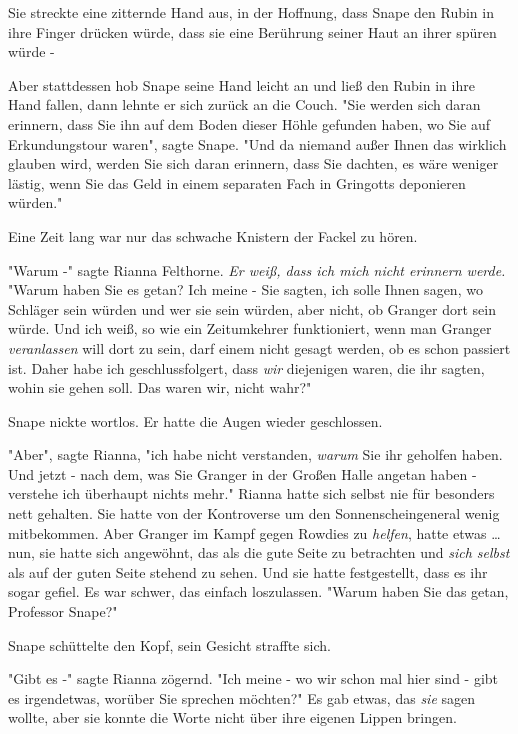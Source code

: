 {Sie streckte eine zitternde Hand aus, in der Hoffnung, dass Snape den Rubin in ihre Finger drücken würde, dass sie eine Berührung seiner Haut an ihrer spüren würde -

Aber stattdessen hob Snape seine Hand leicht an und ließ den Rubin in ihre Hand fallen, dann lehnte er sich zurück an die Couch. "Sie werden sich daran erinnern, dass Sie ihn auf dem Boden dieser Höhle gefunden haben, wo Sie auf Erkundungstour waren", sagte Snape. "Und da niemand außer Ihnen das wirklich glauben wird, werden Sie sich daran erinnern, dass Sie dachten, es wäre weniger lästig, wenn Sie das Geld in einem separaten Fach in Gringotts deponieren würden."

Eine Zeit lang war nur das schwache Knistern der Fackel zu hören.

"Warum -" sagte Rianna Felthorne. \emph{Er weiß, dass ich mich nicht erinnern werde.} "Warum haben Sie es getan? Ich meine - Sie sagten, ich solle Ihnen sagen, wo Schläger sein würden und wer sie sein würden, aber nicht, ob Granger dort sein würde. Und ich weiß, so wie ein Zeitumkehrer funktioniert, wenn man Granger \emph{veranlassen} will dort zu sein, darf einem nicht gesagt werden, ob es schon passiert ist. Daher habe ich geschlussfolgert, dass \emph{wir} diejenigen waren, die ihr sagten, wohin sie gehen soll. Das waren wir, nicht wahr?"

Snape nickte wortlos. Er hatte die Augen wieder geschlossen.

"Aber", sagte Rianna, "ich habe nicht verstanden, \emph{warum} Sie ihr geholfen haben. Und jetzt - nach dem, was Sie Granger in der Großen Halle angetan haben - verstehe ich überhaupt nichts mehr." Rianna hatte sich selbst nie für besonders nett gehalten. Sie hatte von der Kontroverse um den Sonnenscheingeneral wenig mitbekommen. Aber Granger im Kampf gegen Rowdies zu \emph{helfen}, hatte etwas … nun, sie hatte sich angewöhnt, das als die gute Seite zu betrachten und \emph{sich selbst} als auf der guten Seite stehend zu sehen. Und sie hatte festgestellt, dass es ihr sogar gefiel. Es war schwer, das einfach loszulassen. "Warum haben Sie das getan, Professor Snape?"

Snape schüttelte den Kopf, sein Gesicht straffte sich.

"Gibt es -" sagte Rianna zögernd. "Ich meine - wo wir schon mal hier sind - gibt es irgendetwas, worüber Sie sprechen möchten?" Es gab etwas, das \emph{sie} sagen wollte, aber sie konnte die Worte nicht über ihre eigenen Lippen bringen.

}
